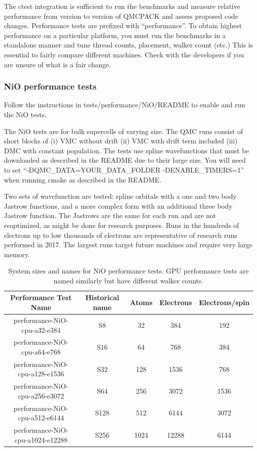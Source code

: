 The ctest integration is sufficient to run the benchmarks and measure
relative performance from version to version of QMCPACK and assess
proposed code changes. Performance tests are prefixed with
``performance''. To obtain highest performance on a particular
platform, you must run the benchmarks in a standalone manner and tune
thread counts, placement, walker count (etc.) This is essential to
fairly compare different machines. Check with the
developers if you are unsure of what is a fair change.

\subsubsection{NiO performance tests}

Follow the instructions in tests/performance/NiO/README to
enable and run the NiO tests.

The NiO tests are for bulk supercells of varying size. The QMC runs consist of short blocks of (i) VMC
without drift (ii) VMC with drift term included (iii) DMC with
constant population. The tests use spline wavefunctions that must be
downloaded as described in the README due to their large size. You
will need to set ``-DQMC\_DATA=YOUR\_DATA\_FOLDER -DENABLE\_TIMERS=1''
when running cmake as
described in the README.

Two sets of wavefunction are tested: spline orbitals with a one and
two body Jastrow functions, and a more complex form with an additional
three body Jastrow function. The Jastrows are the same for each run
and are not reoptimized, as might be done for research purposes.  Runs
in the hundreds of electrons up to low thousands of electrons are representative of
research runs performed in 2017. The largest runs target
future machines and require very large memory.

\begin{table}[h]
\begin{center}
\begin{tabular}{|c|c|c|c|c|}
\hline
\bfseries Performance Test Name&  \bfseries Historical name &\bfseries Atoms& \bfseries Electrons&  \bfseries Electrons/spin \\
\hline
performance-NiO-cpu-a32-e384  & S8 & 32 & 384 & 192 \\
performance-NiO-cpu-a64-e768  & S16 & 64 & 768 & 384 \\
performance-NiO-cpu-a128-e1536 & S32 & 128 & 1536 & 768 \\
performance-NiO-cpu-a256-e3072 & S64 & 256 & 3072 & 1536 \\
performance-NiO-cpu-a512-e6144 & S128 & 512 & 6144 & 3072 \\
performance-NiO-cpu-a1024-e12288& S256 & 1024 & 12288 & 6144 \\
\hline
\end{tabular}
  \caption{System sizes and names for NiO performance tests. GPU performance
    tests are named similarly but have different walker counts.}
  \label{tab:niotests}
\end{center}
\end{table}

